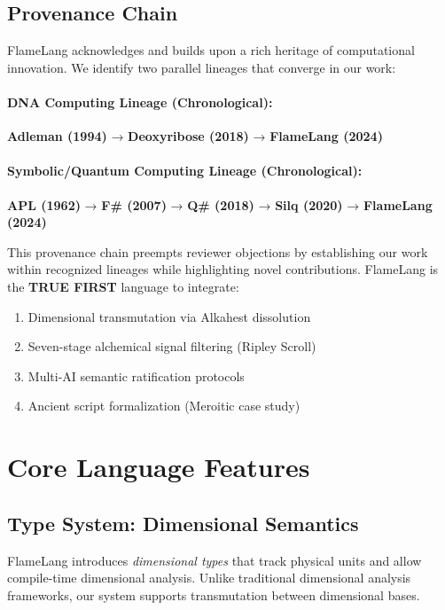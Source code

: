 \documentclass[11pt,a4paper]{article}
\begin{document}
\subsection{Provenance Chain}

FlameLang acknowledges and builds upon a rich heritage of computational innovation. We identify two parallel lineages that converge in our work:

\paragraph{DNA Computing Lineage (Chronological):}
\textbf{Adleman (1994)} → \textbf{Deoxyribose (2018)} → \textbf{FlameLang (2024)}

\paragraph{Symbolic/Quantum Computing Lineage (Chronological):}
\textbf{APL (1962)} → \textbf{F\# (2007)} → \textbf{Q\# (2018)} → \textbf{Silq (2020)} → \textbf{FlameLang (2024)}

This provenance chain preempts reviewer objections by establishing our work within recognized lineages while highlighting novel contributions. FlameLang is the \textbf{TRUE FIRST} language to integrate:
\begin{enumerate}
\item Dimensional transmutation via Alkahest dissolution
\item Seven-stage alchemical signal filtering (Ripley Scroll)
\item Multi-AI semantic ratification protocols
\item Ancient script formalization (Meroitic case study)
\end{enumerate}

\section{Core Language Features}

\subsection{Type System: Dimensional Semantics}

FlameLang introduces \textit{dimensional types} that track physical units and allow compile-time dimensional analysis. Unlike traditional dimensional analysis frameworks, our system supports transmutation between dimensional bases.
\end{document}
